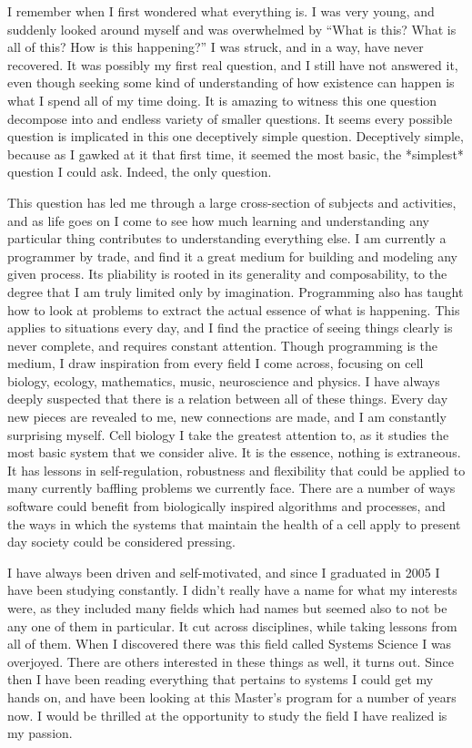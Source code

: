 I remember when I first wondered what everything is. I was very young, and suddenly looked around myself and was overwhelmed by ``What is this? What is all of this? How is this happening?'' I was struck, and in a way, have never recovered. It was possibly my first real question, and I still have not answered it, even though seeking some kind of understanding of how existence can happen is what I spend all of my time doing. It is amazing to witness this one question decompose into and endless variety of smaller questions. It seems every possible question is implicated in this one deceptively simple question. Deceptively simple, because as I gawked at it that first time, it seemed the most basic, the *simplest* question I could ask.  Indeed, the only question. 

This question has led me through a large cross-section of subjects and activities, and as life goes on I come to see how much learning and understanding any particular thing contributes to understanding everything else. I am currently a programmer by trade, and find it a great medium for building and modeling any given process. Its pliability is rooted in its generality and composability, to the degree that I am truly limited only by imagination. Programming also has taught how to look at problems to extract the actual essence of what is happening. This applies to situations every day, and I find the practice of seeing things clearly is never complete, and requires constant attention. Though programming is the medium, I draw inspiration from every field I come across, focusing on cell biology, ecology, mathematics, music, neuroscience and physics. I have always deeply suspected that there is a relation between all of these things.  Every day new pieces are revealed to me, new connections are made, and I am constantly surprising myself. Cell biology I take the greatest attention to, as it studies the most basic system that we consider alive. It is the essence, nothing is extraneous. It has lessons in self-regulation, robustness and flexibility that could be applied to many currently baffling problems we currently face. There are a number of ways software could benefit from biologically inspired algorithms and processes, and the ways in which the systems that maintain the health of a cell apply to present day society could be considered pressing. 

I have always been driven and self-motivated, and since I graduated in 2005 I have been studying constantly. I didn't really have a name for what my interests were, as they included many fields which had names but seemed also to not be any one of them in particular. It cut across disciplines, while taking lessons from all of them. When I discovered there was this field called Systems Science I was overjoyed. There are others interested in these things as well, it turns out. Since then I have been reading everything that pertains to systems I could get my hands on, and have been looking at this Master's program for a number of years now. I would be thrilled at the opportunity to study the field I have realized is my passion. 

